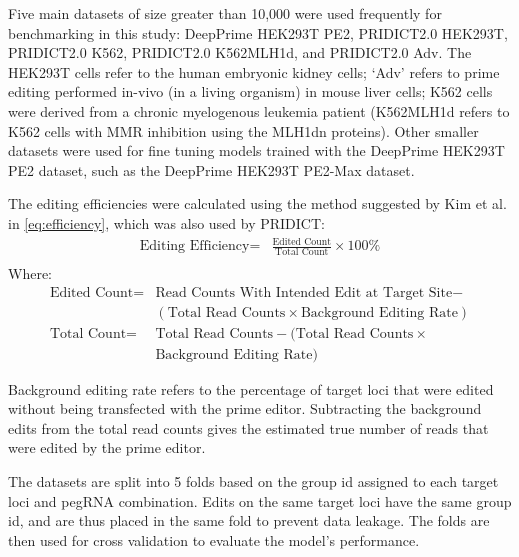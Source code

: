 Five main datasets of size greater than 10,000 were used frequently for benchmarking in this study: DeepPrime HEK293T PE2, PRIDICT2.0 HEK293T, PRIDICT2.0 K562, PRIDICT2.0 K562MLH1d, and PRIDICT2.0 Adv. The HEK293T cells refer to the human embryonic kidney cells\cite{kavsanImmortalizedCellsOne2011}; `Adv' refers to prime editing performed in-vivo (in a living organism) in mouse liver cells; K562 cells were derived from a chronic myelogenous leukemia patient\cite{lozzioMultipotentialLeukemiaCell1981} (K562MLH1d refers to K562 cells with MMR inhibition using the MLH1dn proteins). Other smaller datasets were used for fine tuning models trained with the DeepPrime HEK293T PE2 dataset, such as the DeepPrime HEK293T PE2-Max dataset.

The editing efficiencies were calculated using the method suggested by Kim et al.\cite{kimPredictingEfficiencyPrime2021} in \autoref{eq:efficiency}, which was also used by PRIDICT:
\begin{equation}
    \label{eq:efficiency}
    \begin{split}
        \text{Editing Efficiency} =& \frac{\text{Edited Count}}{\text{Total Count}} \times 100\% \\
    \end{split}
\end{equation}
Where:
\begin{equation}
    \begin{split}
        \text{Edited Count} =& \text{Read Counts With Intended Edit at Target Site} - \\
        &( \text{Total Read Counts} \times \text{Background Editing  Rate} ) \\
        \text{Total Count} =& \text{Total Read Counts} - (\text{Total Read Counts} \times \\ &\text{Background Editing  Rate})
    \end{split}
\end{equation}
        
Background editing rate refers to the percentage of target loci that were edited without being transfected with the prime editor. Subtracting the background edits from the total read counts gives the estimated true number of reads that were edited by the prime editor.

The datasets are split into 5 folds based on the group id assigned to each target loci and pegRNA combination. Edits on the same target loci have the same group id, and are thus placed in the same fold to prevent data leakage. The folds are then used for cross validation to evaluate the model's performance.



